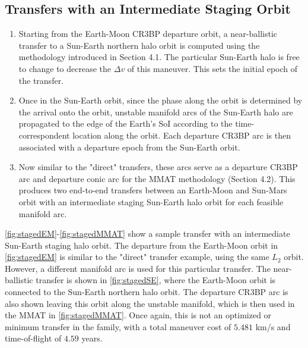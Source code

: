 \subsection{Transfers with an Intermediate Staging Orbit}
\begin{enumerate}
    \item   Starting from the Earth-Moon CR3BP departure orbit, a near-ballistic transfer to a
            Sun-Earth northern halo orbit is computed using the methodology introduced in Section
            4.1. The particular Sun-Earth halo is free to change to decrease the $\Delta v$ of this
            maneuver. This sets the initial epoch of the transfer.
    \item   Once in the Sun-Earth orbit, since the phase along the orbit is determined by the
            arrival onto the orbit, unstable manifold arcs of the Sun-Earth halo are propagated to
            the edge of the Earth's SoI according to the time-correspondent location along the
            orbit. Each departure CR3BP arc is then associated with a departure epoch from the
            Sun-Earth orbit.
    \item   Now similar to the "direct" transfers, these arcs serve as a departure CR3BP arc and
            departure conic arc for the MMAT methodology (Section 4.2). This produces two
            end-to-end transfers between an Earth-Moon and Sun-Mars orbit with an intermediate
            staging Sun-Earth halo orbit for each feasible manifold arc.
\end{enumerate}

\cref{fig:stagedEM}-\cref{fig:stagedMMAT} show a sample transfer with an intermediate Sun-Earth
staging halo orbit. The departure from the Earth-Moon orbit in \cref{fig:stagedEM} is similar to
the "direct" transfer example, using the same $L_{2}$ orbit. However, a different manifold arc is
used for this particular transfer. The near-ballistic transfer is shown in \cref{fig:stagedSE},
where the Earth-Moon orbit is connected to the Sun-Earth northern halo orbit. The departure CR3BP
arc is also shown leaving this orbit along the unstable manifold, which is then used in the MMAT in
\cref{fig:stagedMMAT}. Once again, this is not an optimized or minimum transfer in the family, with
a total maneuver cost of $5.481$ km/s and time-of-flight of $4.59$ years.

